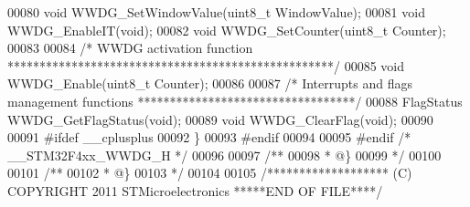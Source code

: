 \begin{DoxyCode}
00080 \textcolor{keywordtype}{void} WWDG_SetWindowValue(uint8\_t WindowValue);
00081 \textcolor{keywordtype}{void} WWDG_EnableIT(\textcolor{keywordtype}{void});
00082 \textcolor{keywordtype}{void} WWDG_SetCounter(uint8\_t Counter);
00083 
00084 \textcolor{comment}{/* WWDG activation function ***************************************************/}
00085 \textcolor{keywordtype}{void} WWDG_Enable(uint8\_t Counter);
00086 
00087 \textcolor{comment}{/* Interrupts and flags management functions **********************************/}
00088 FlagStatus WWDG_GetFlagStatus(\textcolor{keywordtype}{void});
00089 \textcolor{keywordtype}{void} WWDG_ClearFlag(\textcolor{keywordtype}{void});
00090 
00091 \textcolor{preprocessor}{#}\textcolor{preprocessor}{ifdef} \_\_cplusplus
00092 \}
00093 \textcolor{preprocessor}{#}\textcolor{preprocessor}{endif}
00094 
00095 \textcolor{preprocessor}{#}\textcolor{preprocessor}{endif} \textcolor{comment}{/* \_\_STM32F4xx\_WWDG\_H */}
00096 
00097 \textcolor{comment}{/**}
00098 \textcolor{comment}{  * @\}}
00099 \textcolor{comment}{  */}
00100 
00101 \textcolor{comment}{/**}
00102 \textcolor{comment}{  * @\}}
00103 \textcolor{comment}{  */}
00104 
00105 \textcolor{comment}{/******************* (C) COPYRIGHT 2011 STMicroelectronics *****END OF FILE****/}
\end{DoxyCode}
